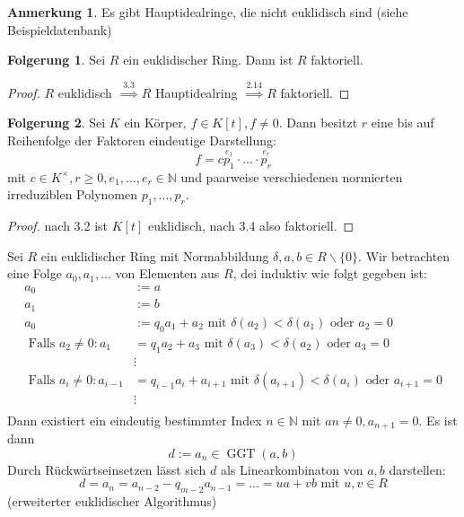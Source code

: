 \documentclass[a4paper, titlepage]{article}
\theoremstyle{definition}
\newtheorem*{anm}{Anmerkung}
\newtheorem*{fg}{Folgerung}
\newcommand{\N}{\mathbb{N}}
\begin{document}
\begin{anm}
    Es gibt Hauptidealringe, die nicht euklidisch sind (siehe Beispieldatenbank)
\end{anm}
\begin{fg}
     Sei $R$ ein euklidischer Ring. Dann ist $R$ faktoriell.
\end{fg}
\begin{proof}
    $R$ euklidisch $\overset{3.3}{\implies} R $ Hauptidealring $\overset{2.14}{\implies} R $ faktoriell.
\end{proof}
\begin{fg}
    Sei $K$ ein Körper, $f\in K[t], f\neq 0$. Dann besitzt $r$ eine bis auf Reihenfolge der Faktoren eindeutige Darstellung:
    $$ f=c\overset{e_1}{p_1}\cdot ... \cdot \overset{e_r}{p_r}$$
    mit $c\in K^{\times}, r\geq 0, e_1,...,e_r\in \N$ und paarweise verschiedenen normierten irreduziblen Polynomen $p_1,...,p_r$.

\end{fg}
\begin{proof}
    nach 3.2 ist $K[t]$ euklidisch, nach 3.4 also faktoriell.
\end{proof}
\begin{satz} Sei $R$ ein euklidischer Ring mit Normabbildung $\delta, a,b \in R\backslash \{0\}$. Wir betrachten eine Folge $a_0,a_1,...$ von Elementen aus $R$, dei induktiv wie folgt gegeben ist: 
    \begin{align*}
        a_0&:= a\\
        a_1&:=b\\
        a_0&:= q_0a_1+a_2 \text{ mit } \delta(a_2)<\delta(a_1) \text{ oder } a_2=0\\
        \text{ Falls }a_2\neq 0: a_1&= q_1a_2+a_3 \text{ mit } \delta(a_3)<\delta(a_2) \text{ oder } a_3=0\\
        &\vdots \\
        \text{ Falls }a_i\neq 0: a_{i-1}&= q_{i-1}a_i+a_{i+1} \text{ mit } \delta(a_{i+1})<\delta(a_i) \text{ oder } a_{i+1}=0\\
        &\vdots\\
    \end{align*}
    Dann existiert ein eindeutig bestimmter Index $n\in \N $ mit $an \neq 0,a_{n+1}=0$. Es ist dann 
    $$d:=a_n\in\operatorname{GGT}(a,b)$$
    Durch Rückwärtseinsetzen lässt sich $d$ als Linearkombinaton von $a,b$ darstellen: 
    $$d=a_n=a_{n-2}-q_{m-2}a_{n-1}=...=ua+vb\text{ mit } u,v\in R$$
    (erweiterter euklidischer Algorithmus)
\end{satz}
\end{document}
